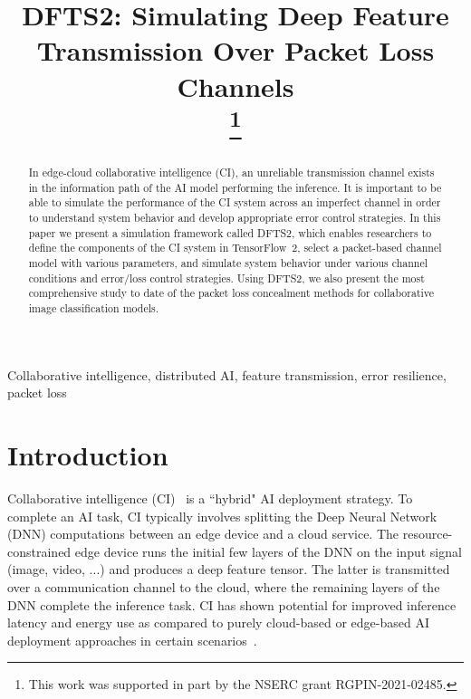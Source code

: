 \documentclass[conference,letterpaper]{IEEEtran}
\begin{document}
\title{\vspace*{0.5cm}DFTS2: Simulating Deep Feature Transmission Over Packet Loss Channels\\
\thanks{This work was supported in part by the NSERC grant RGPIN-2021-02485.}
}

\author{
}

\maketitle

\begin{abstract}
In edge-cloud collaborative intelligence (CI), an unreliable transmission channel exists in the information path of the AI model performing the inference. It is important to be able to simulate the performance of the CI system across an imperfect channel in order to understand system behavior and develop appropriate error control strategies. In this paper we present a simulation framework called DFTS2, which enables researchers to define the components of the CI system in TensorFlow~2, select a packet-based channel model with various parameters, and simulate system behavior under various channel conditions and error/loss control strategies. Using DFTS2, we also present the most comprehensive study to date of the packet loss concealment methods for collaborative image classification models.  
\end{abstract}

\begin{IEEEkeywords}
Collaborative intelligence, distributed AI, feature transmission, error resilience, packet loss
\end{IEEEkeywords}

\thispagestyle{firstpage}

\section{Introduction}
\label{sec:introduction}
Collaborative intelligence (CI)~\cite{neurosurgeon,CI_Overview_ICASSP2021} is a ``hybrid" AI deployment strategy. To complete an AI task, CI typically involves splitting the Deep Neural Network (DNN) computations between an edge device and a cloud service. The resource-constrained edge device runs the initial few layers of the DNN on the input signal (image, video, ...) and produces a deep feature tensor. The latter is transmitted over a communication channel to the cloud, where the remaining layers of the DNN complete the inference task. CI has shown potential for improved inference latency and energy use as compared to purely cloud-based or edge-based AI deployment approaches in certain scenarios~\cite{neurosurgeon,jointdnn}.
\end{document}
